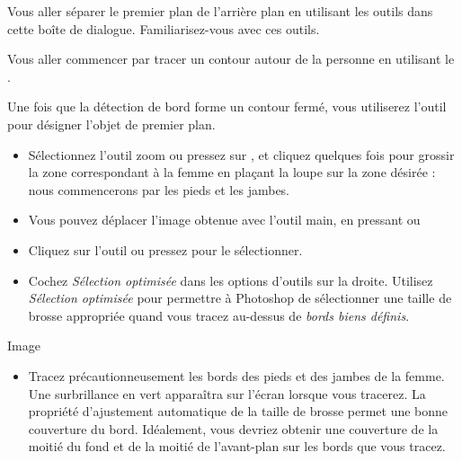 \documentclass[a4paper,12pt,french]{sphinxmanual}
\begin{document}
Vous aller séparer le premier plan de l'arrière plan en utilisant les outils dans cette boîte de dialogue. Familiarisez-vous avec ces outils.

Vous aller commencer par tracer un contour autour de la personne en utilisant le .

Une fois que la détection de bord forme un contour fermé, vous utiliserez l'outil  pour désigner l'objet de premier plan.
\begin{itemize}
\item {} 
Sélectionnez l'outil zoom ou pressez sur , et cliquez quelques fois pour grossir la zone correspondant à la femme en plaçant la loupe sur la zone désirée : nous commencerons par les pieds et les jambes.

\item {} 
Vous pouvez déplacer l'image obtenue avec l'outil main, en pressant  ou 

\item {} 
Cliquez sur l'outil  ou pressez  pour le sélectionner.

\item {} 
Cochez \emph{Sélection optimisée} dans les options d'outils sur la droite. Utilisez \emph{Sélection optimisée} pour permettre à Photoshop de sélectionner une taille de brosse appropriée quand vous tracez au-dessus de \emph{bords biens définis}.

\end{itemize}

Image
\begin{itemize}
\item {} 
Tracez précautionneusement les bords des pieds et des jambes de la femme. Une surbrillance en vert apparaîtra sur l'écran lorsque vous tracerez. La propriété d'ajustement automatique de la taille de brosse permet une bonne couverture du bord. Idéalement, vous devriez obtenir une couverture de la moitié du fond et de la moitié de l'avant-plan sur les bords que vous tracez.

\end{itemize}
\end{document}
